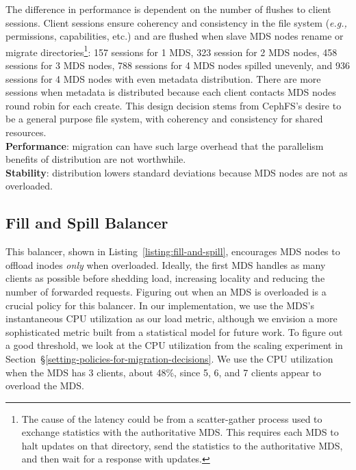 The difference in performance is dependent on the number of flushes to client sessions. Client sessions ensure coherency and consistency in the file system ({\it e.g.,} permissions, capabilities, etc.) and are flushed when slave MDS nodes rename or migrate directories\footnote{The cause of the latency could be from a scatter-gather process used to exchange statistics with the authoritative MDS. This requires each MDS to halt updates on that directory, send the statistics to the authoritative MDS, and then wait for a response with updates.}: 157 sessions for 1 MDS, 323 session for 2 MDS nodes, 458 sessions for 3 MDS nodes, 788 sessions for 4 MDS nodes spilled unevenly, and 936 sessions for 4 MDS nodes with even metadata distribution. There are more sessions when metadata is distributed because each client contacts MDS nodes round robin for each create. This design decision stems from CephFS's desire to be a general purpose file system, with coherency and consistency for shared resources.\\

\noindent\textbf{Performance}: migration can have such large overhead that the parallelism benefits of distribution are not worthwhile.\\
\noindent\textbf{Stability}: distribution lowers standard deviations because MDS nodes are not as overloaded.

\subsection{Fill and Spill Balancer}					%
\label{fill-and-spill-balancer}							%
This balancer, shown in Listing~\ref{listing:fill-and-spill}, encourages MDS nodes to offload inodes {\it only} when overloaded.  Ideally, the first MDS handles as many clients as possible before shedding load, increasing locality and reducing the number of forwarded requests. Figuring out when an MDS is overloaded is a crucial policy for this balancer. In our implementation, we use the MDS's instantaneous CPU utilization as our load metric, although we envision a more sophisticated metric built from a statistical model for future work. To figure out a good threshold, we look at the CPU utilization from the scaling experiment in Section~\S\ref{setting-policies-for-migration-decisions}. We use the CPU utilization when the MDS has 3 clients, about 48\%, since 5, 6, and 7 clients appear to overload the MDS.  

